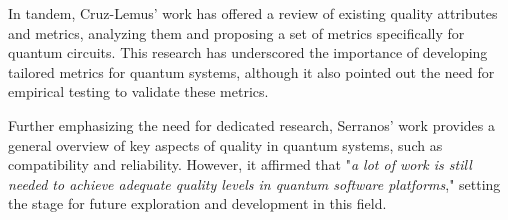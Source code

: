 In tandem, Cruz-Lemus' work \cite{26} has offered a review of existing quality attributes and metrics, analyzing them and proposing a set of metrics specifically for quantum circuits. This research has underscored the importance of developing tailored metrics for quantum systems, although it also pointed out the need for empirical testing to validate these metrics.

Further emphasizing the need for dedicated research, Serranos' work \cite{Serrano2022} provides a general overview of key aspects of quality in quantum systems, such as compatibility and reliability. However, it affirmed that "\textit{a lot of work is still needed to achieve adequate quality levels in quantum software platforms}," setting the stage for future exploration and development in this field.


